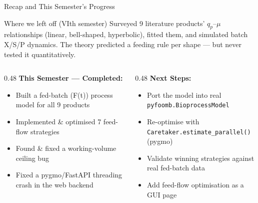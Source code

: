 \documentclass[aspectratio=169, 11pt]{beamer}
\begin{document}
\begin{frame}{Recap and This Semester's Progress}
  \begin{block}{Where we left off (VIth semester)}
    Surveyed 9 literature products' $q_p$--$\mu$ relationships (linear, bell-shaped,
    hyperbolic), fitted them, and simulated batch X/S/P dynamics. The theory predicted
    a feeding rule per shape --- but never tested it quantitatively.
  \end{block}

  \vspace{0.3cm}
  \begin{columns}[T]
    \begin{column}{0.48\textwidth}
      \textbf{This Semester --- Completed:}
      \begin{itemize}
        \item[\textcolor{donegreen}{\checkmark}] Built a fed-batch (F(t)) process model for all 9 products
        \item[\textcolor{donegreen}{\checkmark}] Implemented \& optimised 7 feed-flow strategies
        \item[\textcolor{donegreen}{\checkmark}] Found \& fixed a working-volume ceiling bug
        \item[\textcolor{donegreen}{\checkmark}] Fixed a pygmo/FastAPI threading crash in the web backend
      \end{itemize}
    \end{column}
    \begin{column}{0.48\textwidth}
      \textbf{Next Steps:}
      \begin{itemize}
        \item[\textcolor{pendinggray}{$\circ$}] Port the model into real \texttt{pyfoomb.BioprocessModel}
        \item[\textcolor{pendinggray}{$\circ$}] Re-optimise with \texttt{Caretaker.estimate\_parallel()} (pygmo)
        \item[\textcolor{pendinggray}{$\circ$}] Validate winning strategies against real fed-batch data
        \item[\textcolor{pendinggray}{$\circ$}] Add feed-flow optimisation as a GUI page
      \end{itemize}
    \end{column}
  \end{columns}
\end{frame}
\end{document}
